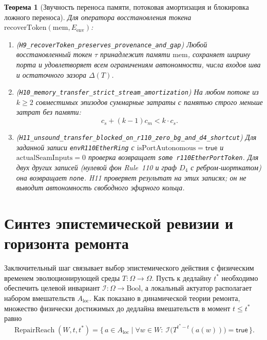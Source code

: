 \documentclass[11pt,a4paper]{article}
\theoremstyle{cleanthm}
\newtheorem{theorem}{Теорема}[section]
\theoremstyle{cleandef}
\DeclareMathOperator{\RepairReach}{RepairReach}
\begin{document}
\begin{theorem}[Звучность переноса памяти, потоковая амортизация и блокировка ложного переноса]
\label{thm:h9_h11_memory}
Для оператора восстановления токена $\mathrm{recoverToken}(\mathrm{mem}, E_{\mathrm{env}})$:
\begin{enumerate}
  \item (\texttt{H9\_recoverToken\_\allowbreak preserves\_\allowbreak provenance\_\allowbreak and\_\allowbreak gap}) Любой восстановленный токен $\tau$ принадлежит памяти $\mathrm{mem}$, сохраняет ширину порта и удовлетворяет всем ограничениям автономности, числа входов шва и остаточного зазора $\Delta(T)$.
  \item (\texttt{H10\_memory\_\allowbreak transfer\_\allowbreak strict\_\allowbreak stream\_\allowbreak amortization}) На любом потоке из $k\ge 2$ совместимых эпизодов суммарные затраты с памятью строго меньше затрат без памяти:
  \begin{equation}
    c_s + (k-1)c_m < k\cdot c_s.
  \end{equation}
  \item (\texttt{H11\_unsound\_\allowbreak transfer\_\allowbreak blocked\_\allowbreak on\_\allowbreak r110\_\allowbreak zero\_\allowbreak bg\_\allowbreak and\_\allowbreak d4\_\allowbreak shortcut}) Для заданной записи \texttt{envR110EtherRing} с $\mathrm{isPortAutonomous}=\mathsf{true}$ и $\mathrm{actualSeamInputs}=0$ проверка возвращает \texttt{some r110EtherPortToken}. Для двух других записей (нулевой фон Rule~110 и граф $D_4$ с ребром-шорткатом) она возвращает \texttt{none}. H11 проверяет результат на этих записях; он не выводит автономность свободного эфирного кольца.
\end{enumerate}
\end{theorem}

\section{Синтез эпистемической ревизии и горизонта ремонта}

Заключительный шаг связывает выбор эпистемического действия с физическим временем эволюционирующей среды $T:\Omega\to\Omega$. Пусть к дедлайну $t^*$ необходимо обеспечить целевой инвариант $\mathcal{I}:\Omega\to\mathrm{Bool}$, а локальный актуатор располагает набором вмешательств $A_{\mathrm{loc}}$. Как показано в динамической теории ремонта, множество физически достижимых до дедлайна вмешательств в момент $t\le t^*$ равно
\begin{equation}
  \RepairReach(W,t,t^*) = \bigl\{\, a\in A_{\mathrm{loc}} \;\big|\; \forall w\in W:\ \mathcal{I}\bigl(T^{t^*-t}(a(w))\bigr)=\mathsf{true} \,\bigr\}.
\end{equation}
\end{document}

